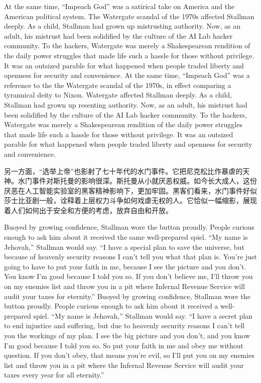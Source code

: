 \ifdefined\eng
\ifdefined\vone
At the same time, ``Impeach God'' was a satirical take on America and the American political system. The Watergate scandal of the 1970s affected Stallman deeply. As a child, Stallman had grown up mistrusting authority. Now, as an adult, his mistrust had been solidified by the culture of the AI Lab hacker community. To the hackers, Watergate was merely a Shakespearean rendition of the daily power struggles that made life such a hassle for those without privilege. It was an outsized parable for what happened when people traded liberty and openness for security and convenience.
\fi
\ifdefined\vtwo
At the same time, ``Impeach God'' was a reference to the the Watergate scandal of the 1970s, in effect comparing a tyrannical deity to Nixon.  Watergate affected Stallman deeply. As a child, Stallman had grown up resenting authority. Now, as an adult, his mistrust had been solidified by the culture of the AI Lab hacker community. To the hackers, Watergate was merely a Shakespearean rendition of the daily power struggles that made life such a hassle for those without privilege. It was an outsized parable for what happened when people traded liberty and openness for security and convenience.
\fi
\fi

\ifdefined\chs
另一方面，``选举上帝''也影射了七十年代的水门事件。它把尼克松比作暴虐的天神。水门事件对斯托曼的影响很深。斯托曼从小就厌恶权威。如今长大成人，这份厌恶在人工智能实验室的黑客精神影响下，更加牢固。黑客们看来，水门事件好似莎士比亚剧一般，诠释着上层权力斗争如何戏虐无权的人。它恰似一幅缩影，展现着人们如何出于安全和方便的考虑，放弃自由和开放。
\fi

\ifdefined\eng
\ifdefined\vone
Buoyed by growing confidence, Stallman wore the button proudly. People curious enough to ask him about it received the same well-prepared spiel. ``My name is Jehovah,'' Stallman would say. ``I have a special plan to save the universe, but because of heavenly security reasons I can't tell you what that plan is. You're just going to have to put your faith in me, because I see the picture and you don't. You know I'm good because I told you so. If you don't believe me, I'll throw you on my enemies list and throw you in a pit where Infernal Revenue Service will audit your taxes for eternity.''
\fi
\ifdefined\vtwo
Buoyed by growing confidence, Stallman wore the button proudly. People curious enough to ask him about it received a well-prepared spiel. ``My name is Jehovah,'' Stallman would say. ``I have a secret plan to end injustice and suffering, but due to heavenly security reasons I can't tell you the workings of my plan. I see the big picture and you don't, and you know I'm good because I told you so. So put your faith in me and obey me without question. If you don't obey, that means you're evil, so I'll put you on my enemies list and throw you in a pit where the Infernal Revenue Service will audit your taxes every year for all eternity.''
\fi
\fi

